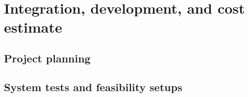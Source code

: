\section{Integration, development, and cost estimate}

\subsection{Project planning}

\subsection{System tests and feasibility setups}

\clearpage
